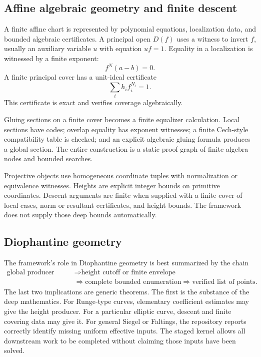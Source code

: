 \subsection{Affine algebraic geometry and finite descent}

A finite affine chart is represented by polynomial equations, localization data, and bounded algebraic
certificates.  A principal open \(D(f)\) uses a witness to invert \(f\), usually an auxiliary variable
\(u\) with equation \(uf=1\).  Equality in a localization is witnessed by a finite exponent:
\[
 f^N(a-b)=0.
\]
A finite principal cover has a unit-ideal certificate
\[
 \sum_i h_i f_i^{N_i}=1.
\]
This certificate is exact and verifies coverage algebraically.

Gluing sections on a finite cover becomes a finite equalizer calculation.  Local sections have codes;
overlap equality has exponent witnesses; a finite Cech-style compatibility table is checked; and an
explicit algebraic gluing formula produces a global section.  The entire construction is a static proof
graph of finite algebra nodes and bounded searches.

Projective objects use homogeneous coordinate tuples with normalization or equivalence witnesses.  Heights
are explicit integer bounds on primitive coordinates.  Descent arguments are finite when supplied with a
finite cover of local cases, norm or resultant certificates, and height bounds.  The framework does not
supply those deep bounds automatically.

\subsection{Diophantine geometry}

The framework's role in Diophantine geometry is best summarized by the chain
\[
\begin{aligned}
 \text{global producer data}
 &\Longrightarrow \text{height cutoff or finite envelope}\\
 &\Longrightarrow \text{complete bounded enumeration}
 \Longrightarrow \text{verified list of points}.
\end{aligned}
\]
The last two implications are generic theorems.  The first is the substance of the deep mathematics.
For Runge-type curves, elementary coefficient estimates may give the height producer.  For a particular
elliptic curve, descent and finite covering data may give it.  For general Siegel or Faltings, the repository
reports correctly identify missing uniform effective inputs.  The staged kernel allows all downstream work
to be completed without claiming those inputs have been solved.

